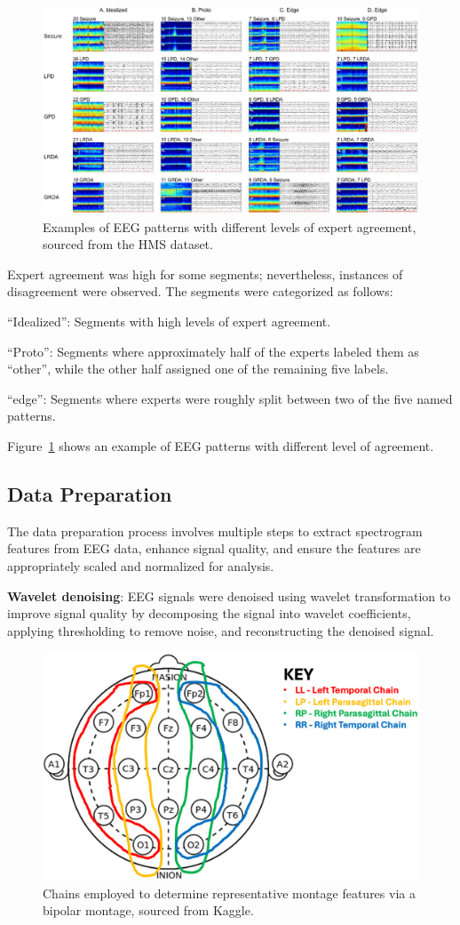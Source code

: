 \documentclass[conference]{IEEEtran}
\let\proglang=\textsf
\let\pkg=\texttt
\begin{document}
\begin{figure}[tp]
\centering
\includegraphics[width=.48\textwidth]{example}
\caption{Examples of EEG patterns with different levels of expert agreement,
sourced from the HMS dataset.}
\label{fig:ex}
\end{figure}


Expert agreement was high for some segments; nevertheless, instances of
disagreement were observed. The segments were categorized as follows:
\begin{enumerate*}[label = (\roman*)]
\item ``Idealized'': Segments with high levels of expert agreement.
\item ``Proto'': Segments where approximately half of the experts labeled them
as ``other'', while the other half assigned one of the remaining five labels.
\item ``edge'': Segments where experts were roughly split between two of the
five named patterns.
\end{enumerate*}
Figure~\ref{fig:ex} shows an example of EEG patterns with different level of
agreement.


\subsection{Data Preparation}


The data preparation process involves multiple steps to extract spectrogram
features from EEG data, enhance signal quality, and ensure the features are
appropriately scaled and normalized for analysis.


\textbf{Wavelet denoising}: EEG signals were denoised using wavelet
transformation to improve signal quality by decomposing the signal into wavelet
coefficients, applying thresholding to remove noise, and reconstructing the
denoised signal.


\begin{figure}[tp]
\centering
\includegraphics[width=.45\textwidth]{inion}
\caption{Chains employed to determine representative montage features via
a bipolar montage, sourced from Kaggle.}
\label{fig:inion}
\end{figure}
\end{document}
